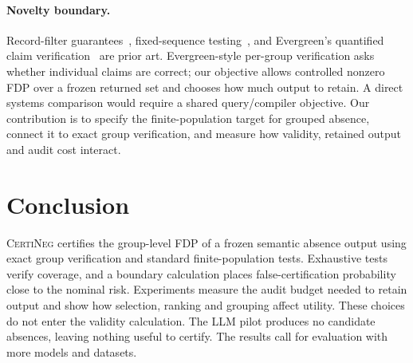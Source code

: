 \documentclass[runningheads]{llncs}
\newcommand{\CN}{\textsc{CertiNeg}\xspace}
\begin{document}
\paragraph{Novelty boundary.} Record-filter guarantees~\cite{supg2020,bargain2026,semviews2026}, fixed-sequence testing~\cite{ltt2025}, and Evergreen's quantified claim verification~\cite{evergreen2026} are prior art. Evergreen-style per-group verification asks whether individual claims are correct; our objective allows controlled nonzero FDP over a frozen returned set and chooses how much output to retain. A direct systems comparison would require a shared query/compiler objective. Our contribution is to specify the finite-population target for grouped absence, connect it to exact group verification, and measure how validity, retained output and audit cost interact.

\section{Conclusion}
\CN certifies the group-level FDP of a frozen semantic absence output using exact group verification and standard finite-population tests. Exhaustive tests verify coverage, and a boundary calculation places false-certification probability close to the nominal risk. Experiments measure the audit budget needed to retain output and show how selection, ranking and grouping affect utility. These choices do not enter the validity calculation. The LLM pilot produces no candidate absences, leaving nothing useful to certify. The results call for evaluation with more models and datasets.



\end{document}
